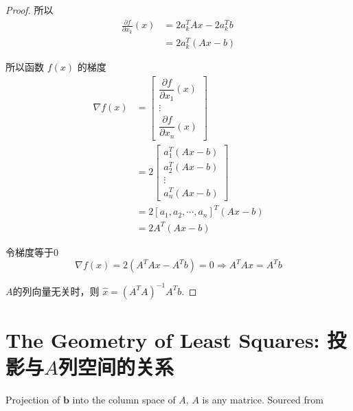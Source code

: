 \begin{proof}
    所以
    \begin{equation}
    \begin{aligned}
        \frac{\partial f}{\partial x_{k}}(x)
        &=2 a_{k}^{T} A x-2 a_{k}^{T} b\\
        &=2 a_{k}^{T}(A x-b)
    \end{aligned}
    \end{equation}

    所以函数 $ f(x) $ 的梯度
\begin{equation}
\begin{aligned}
    \nabla f(x)&=\left[\begin{array}{c}
    \dfrac{\partial f}{\partial x_{1}}(x) \\
    \vdots \\
    \dfrac{\partial f}{\partial x_{n}}(x)
    \end{array}\right]\\
    &=2\left[\begin{array}{c}
    a_{1}^{T}(A x-b) \\
    a_{2}^{T}(A x-b) \\
    \vdots \\
    a_{n}^{T}(A x-b)
    \end{array}\right] \\
    &= 2\left[a_{1}, a_{2}, \cdots, a_{n}\right]^{T}(A x-b) \\
    &=2 A^{T}(A x-b) 
\end{aligned}
\end{equation}

令梯度等于0
\begin{equation}\nabla f(x)=2\left(A^{T} A x-A^{T} b\right)=0 \Rightarrow A^{T} A x=A^{T} b\end{equation}

$A$的列向量无关时，则 $ \hat{x}=\left(A^{T} A\right)^{-1} A^{T} b $.

\end{proof}

\section{The Geometry of Least Squares: 投影与$A$列空间的关系}

\begin{FigureCenter}{Projection of $\boldsymbol{b}$ into the column space of ${A}$, $A$ is any matrice. Sourced from \cite{Strang1993IntroductionTL}}
    
\end{FigureCenter}

